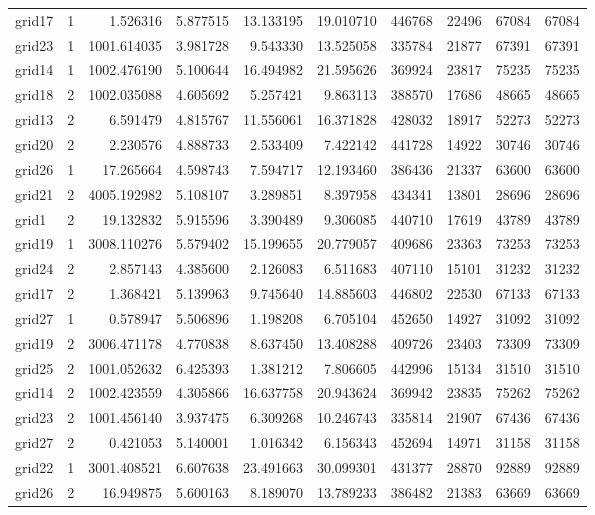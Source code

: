 \begin{longtable}{|l|r|r|r|r|r|r|r|r|r|}
grid17 & 1 & 1.526316 & 5.877515 & 13.133195 & 19.010710 & 446768 & 22496 & 67084 & 67084 \\
grid23 & 1 & 1001.614035 & 3.981728 & 9.543330 & 13.525058 & 335784 & 21877 & 67391 & 67391 \\
grid14 & 1 & 1002.476190 & 5.100644 & 16.494982 & 21.595626 & 369924 & 23817 & 75235 & 75235 \\
grid18 & 2 & 1002.035088 & 4.605692 & 5.257421 & 9.863113 & 388570 & 17686 & 48665 & 48665 \\
grid13 & 2 & 6.591479 & 4.815767 & 11.556061 & 16.371828 & 428032 & 18917 & 52273 & 52273 \\
grid20 & 2 & 2.230576 & 4.888733 & 2.533409 & 7.422142 & 441728 & 14922 & 30746 & 30746 \\
grid26 & 1 & 17.265664 & 4.598743 & 7.594717 & 12.193460 & 386436 & 21337 & 63600 & 63600 \\
grid21 & 2 & 4005.192982 & 5.108107 & 3.289851 & 8.397958 & 434341 & 13801 & 28696 & 28696 \\
grid1 & 2 & 19.132832 & 5.915596 & 3.390489 & 9.306085 & 440710 & 17619 & 43789 & 43789 \\
grid19 & 1 & 3008.110276 & 5.579402 & 15.199655 & 20.779057 & 409686 & 23363 & 73253 & 73253 \\
grid24 & 2 & 2.857143 & 4.385600 & 2.126083 & 6.511683 & 407110 & 15101 & 31232 & 31232 \\
grid17 & 2 & 1.368421 & 5.139963 & 9.745640 & 14.885603 & 446802 & 22530 & 67133 & 67133 \\
grid27 & 1 & 0.578947 & 5.506896 & 1.198208 & 6.705104 & 452650 & 14927 & 31092 & 31092 \\
grid19 & 2 & 3006.471178 & 4.770838 & 8.637450 & 13.408288 & 409726 & 23403 & 73309 & 73309 \\
grid25 & 2 & 1001.052632 & 6.425393 & 1.381212 & 7.806605 & 442996 & 15134 & 31510 & 31510 \\
grid14 & 2 & 1002.423559 & 4.305866 & 16.637758 & 20.943624 & 369942 & 23835 & 75262 & 75262 \\
grid23 & 2 & 1001.456140 & 3.937475 & 6.309268 & 10.246743 & 335814 & 21907 & 67436 & 67436 \\
grid27 & 2 & 0.421053 & 5.140001 & 1.016342 & 6.156343 & 452694 & 14971 & 31158 & 31158 \\
grid22 & 1 & 3001.408521 & 6.607638 & 23.491663 & 30.099301 & 431377 & 28870 & 92889 & 92889 \\
grid26 & 2 & 16.949875 & 5.600163 & 8.189070 & 13.789233 & 386482 & 21383 & 63669 & 63669 \\

\end{longtable}
